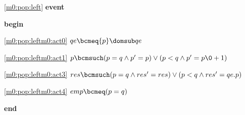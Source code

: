 \noindent \ref{m0:pop:left}  \textbf{event}
\begin{block}
  \item   \textbf{begin}
  \begin{block}
  \item[ \eqref{m0:pop:leftm0:act0} ]$qe \bcmeq \{ p \} \domsub qe $ %
  \item[ \eqref{m0:pop:leftm0:act1} ]$p \bcmsuch (p = q \land p' = p) \lor (p < q \land p' = p\0+1) $ %
  \item[ \eqref{m0:pop:leftm0:act3} ]$res \bcmsuch (p = q \land res' = res) \lor (p < q \land res' = qe.p) $ %
  \item[ \eqref{m0:pop:leftm0:act4} ]$emp \bcmeq (p = q) $ %
  \end{block}
  \item   \textbf{end} \\
\end{block}
